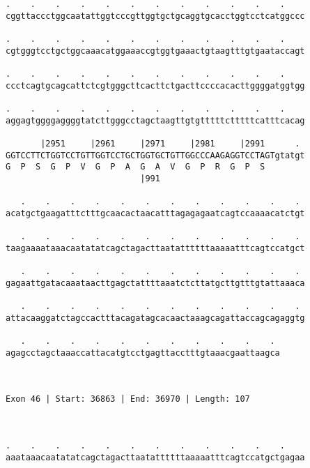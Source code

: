 \documentclass{article}
\begin{document}
\begin{Verbatim}
.    .    .    .    .    .    .    .    .    .    .    .    
cggttaccctggcaatattggtcccgttggtgctgcaggtgcacctggtcctcatggccc
                                                            
.    .    .    .    .    .    .    .    .    .    .    .    
cgtgggtcctgctggcaaacatggaaaccgtggtgaaactgtaagtttgtgaataccagt
                                                            
.    .    .    .    .    .    .    .    .    .    .    .    
ccctcagtgcagcattctcgtgggcttcacttctgacttccccacacttggggatggtgg
                                                            
.    .    .    .    .    .    .    .    .    .    .    .    
aggagtggggaggggtatcttgggcctagctaagttgtgtttttctttttcatttcacag
                                                            
       |2951     |2961     |2971     |2981     |2991      . 
GGTCCTTCTGGTCCTGTTGGTCCTGCTGGTGCTGTTGGCCCAAGAGGTCCTAGTgtatgt
G  P  S  G  P  V  G  P  A  G  A  V  G  P  R  G  P  S        
                           |991                             
  
   .    .    .    .    .    .    .    .    .    .    .    . 
acatgctgaagatttctttgcaacactaacatttagagagaatcagtccaaaacatctgt
                                                            
   .    .    .    .    .    .    .    .    .    .    .    . 
taagaaaataaacaatatatcagctagacttaatattttttaaaaatttcagtccatgct
                                                            
   .    .    .    .    .    .    .    .    .    .    .    . 
gagaattgatacaaataacttgagctattttaaatctcttatgcttgtttgtattaaaca
                                                            
   .    .    .    .    .    .    .    .    .    .    .    . 
attacaaggatctagccactttacagatagcacaactaaagcagattaccagcagaggtg
                                                            
   .    .    .    .    .    .    .    .    .    .    . 
agagcctagctaaaccattacatgtcctgagttacctttgtaaacgaattaagca
                                                       
                                                       
 
Exon 46 | Start: 36863 | End: 36970 | Length: 107



.    .    .    .    .    .    .    .    .    .    .    .    
aaataaacaatatatcagctagacttaatattttttaaaaatttcagtccatgctgagaa
                                                            

\end{Verbatim}
\end{document}
